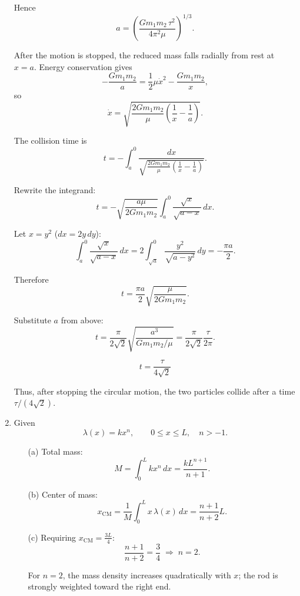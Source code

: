\documentclass[../main.tex]{subfiles}
\begin{document}
\begin{enumerate}
Hence
\[
a=\left(\frac{G m_1 m_2\,\tau^2}{4\pi^2\mu}\right)^{1/3}.
\]

After the motion is stopped, the reduced mass falls radially from rest at \(x=a\).
Energy conservation gives
\[
-\frac{G m_1 m_2}{a}
=\frac12\mu \dot x^2-\frac{G m_1 m_2}{x},
\]
so
\[
\dot x=\sqrt{\frac{2G m_1 m_2}{\mu}\left(\frac1x-\frac1a\right)}.
\]

The collision time is
\[
t=-\int_a^0
\frac{dx}{\sqrt{\tfrac{2G m_1 m_2}{\mu}\left(\frac1x-\frac1a\right)}}.
\]

Rewrite the integrand:
\[
t=-\sqrt{\frac{a\mu}{2G m_1 m_2}}
\int_a^0 \frac{\sqrt{x}}{\sqrt{a-x}}\,dx.
\]

Let \(x=y^2\) (\(dx=2y\,dy\)):
\[
\int_a^0 \frac{\sqrt{x}}{\sqrt{a-x}}\,dx
=2\int_{\sqrt a}^0 \frac{y^2}{\sqrt{a-y^2}}\,dy
=-\frac{\pi a}{2}.
\]

Therefore
\[
t=\frac{\pi a}{2}\sqrt{\frac{\mu}{2G m_1 m_2}}.
\]

Substitute \(a\) from above:
\[
t=\frac{\pi}{2\sqrt2}\sqrt{\frac{a^3}{G m_1 m_2/\mu}}
=\frac{\pi}{2\sqrt2}\frac{\tau}{2\pi}.
\]

\[
\boxed{\,t=\dfrac{\tau}{4\sqrt2}\,}
\]

Thus, after stopping the circular motion, the two particles collide after a time
\(\tau/(4\sqrt2)\).


\item Given
\[
\lambda(x)=k x^n,\qquad 0\le x\le L,\quad n>-1.
\]

\begin{enumerate}
\item[(a)] Total mass:
\[
M=\int_0^L kx^n\,dx=\frac{kL^{n+1}}{n+1}.
\]

\item[(b)] Center of mass:
\[
x_{\mathrm{CM}}=\frac{1}{M}\int_0^L x\,\lambda(x)\,dx
=\frac{n+1}{n+2}L.
\]

\item[(c)] Requiring \(x_{\mathrm{CM}}=\tfrac{3L}{4}\):
\[
\frac{n+1}{n+2}=\frac34 \;\Rightarrow\; n=2.
\]

For \(n=2\), the mass density increases quadratically with \(x\); the rod is strongly weighted toward the right end.
\end{enumerate}

\end{enumerate}
\end{document}

